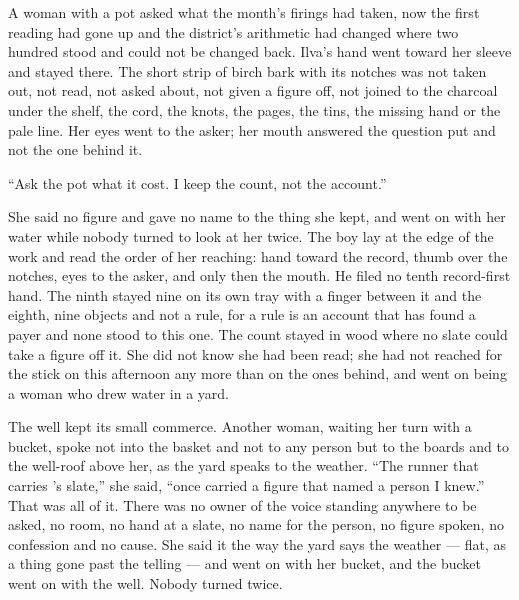 A woman with a pot asked what the month's firings had taken, now the first reading had gone up  and the district's arithmetic had changed where two hundred stood and could not be changed back. Ilva's hand went toward her sleeve and stayed there. The short strip of birch bark with its notches was not taken out, not read, not asked about, not given a figure off, not joined to the charcoal under the shelf, the cord, the knots, the pages, the tins, the missing hand or the pale line. Her eyes went to the asker; her mouth answered the question put and not the one behind it.

“Ask the pot what it cost. I keep the count, not the account.”

She said no figure and gave no name to the thing she kept, and went on with her water while nobody turned to look at her twice. The boy lay at the edge of the work and read the order of her reaching: hand toward the record, thumb over the notches, eyes to the asker, and only then the mouth. He filed no tenth record-first hand. The ninth stayed nine on its own tray with a finger between it and the eighth, nine objects and not a rule, for a rule is an account that has found a payer and none stood to this one. The count stayed in wood where no slate could take a figure off it. She did not know she had been read; she had not reached for the stick on this afternoon any more than on the ones behind, and went on being a woman who drew water in a yard.

The well kept its small commerce. Another woman, waiting her turn with a bucket, spoke not into the basket and not to any person but to the boards and to the well-roof above her, as the yard speaks to the weather. “The runner that carries 's slate,” she said, “once carried a figure that named a person I knew.” That was all of it. There was no owner of the voice standing anywhere to be asked, no room, no hand at a slate, no name for the person, no figure spoken, no confession and no cause. She said it the way the yard says the weather --- flat, as a thing gone past the telling --- and went on with her bucket, and the bucket went on with the well. Nobody turned twice.

